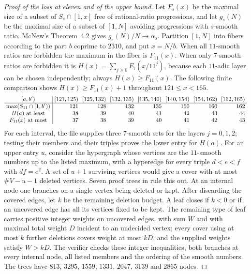 \begin{proof}[Proof of the loss at eleven and of the upper bound]
Let $F_s(x)$ be the maximal size of a subset of $S_s\cap[1,x]$ free of rational-ratio
progressions, and let $g_s(N)$ be the maximal size of a subset of $[1,N]$ avoiding
progressions with $s$-smooth ratio. McNew's Theorem~4.2 gives $g_s(N)/N\to\overline\alpha_s$.
Partition $[1,N]$ into fibers according to the part $b$ coprime to $2310$, and put $x=N/b$.
When all $11$-smooth ratios are forbidden the maximum in the fiber is $F_{11}(x)$. When only
$7$-smooth ratios are forbidden it is $H(x)=\sum_{j\ge0}F_7(x/11^j)$, because each
$11$-adic layer can be chosen independently; always $H(x)\ge F_{11}(x)$. The following finite
comparison shows $H(x)\ge F_{11}(x)+1$ throughout $121\le x<165$.
\[
\small\setlength{\arraycolsep}{3pt}
\begin{array}{c|rrrrrrr}
 [a,b') &[121,125)&[125,132)&[132,135)&[135,140)&[140,154)&[154,162)&[162,165)\\
 \hline
 \max(S_{11}\cap[1,b')) &121&128&132&135&150&160&162\\
 H(a)\ \text{at least} &38&39&40&41&42&43&44\\
 F_{11}(x)\ \text{at most} &37&38&39&40&41&42&43
\end{array}
\]
For each interval, the file
supplies three
$7$-smooth sets for the layers $j=0,1,2$; testing their members and their triples proves the
lower entry for $H(a)$. For an upper entry $u$, consider the hypergraph whose vertices are
the $11$-smooth numbers up to the listed maximum, with a hyperedge for every triple $d<e<f$
with $df=e^2$. A set of $u+1$ surviving vertices would give a cover with at most
$\#V-u-1$ deleted vertices. Seven proof trees in
rule this out. At an
internal node one branches on a single vertex being deleted or kept. After discarding the
covered edges, let $k$ be the remaining deletion budget. A leaf closes if $k<0$ or if an
uncovered edge has all its vertices fixed to be kept. The remaining type of leaf carries
positive integer weights on uncovered edges, with sum $W$ and with maximal total weight $D$
incident to an undecided vertex; every cover using at most $k$ further deletions covers
weight at most $kD$, and the supplied weights satisfy $W>kD$. The verifier checks these
integer inequalities, both branches at every internal node, all listed members and the
ordering of the smooth numbers. The trees have $813$, $3295$, $1559$, $1331$, $2047$, $3139$
and $2865$ nodes.


\end{proof}
